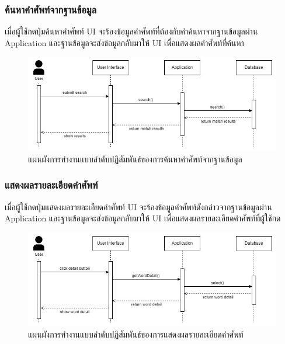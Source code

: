 \documentclass[12pt,oneside,openright,a4paper]{cpe-thai-project}
\begin{document}
\pagebreak
\subsubsection{ค้นหาคำศัพท์จากฐานข้อมูล}
\hspace{1cm}
เมื่อผู้ใช้กดปุ่มค้นหาคำศัพท์ UI จะร้องข้อมูลคำศัพท์ที่ต้องกับคำค้นหาจากฐานข้อมูลผ่าน Application
และฐานข้อมูลจะส่งข้อมูลกลับมาให้ UI เพื่อแสดงผลคำศัพท์ที่ค้นหา
\begin{figure}[!h]\centering
	\includegraphics[width=\textwidth, keepaspectratio=true]{image/chap3/sequence/Search.jpg}
	\caption{แผนผังการทำงานแบบลำดับปฏิสัมพันธ์ของการค้นหาคำศัพท์จากฐานข้อมูล}\label{fig:S_SearchWord}
\end{figure}

\subsubsection{แสดงผลรายละเอียดคำศัพท์}
\hspace{1cm}
เมื่อผู้ใช้กดปุ่มแสดงผลรายละเอียดคำศัพท์ UI จะร้องข้อมูลคำศัพท์ดังกล่าวจากฐานข้อมูลผ่าน Application
และฐานข้อมูลจะส่งข้อมูลกลับมาให้ UI เพื่อแสดงผลรายละเอียดคำศัพท์ที่ผู้ใช้กด
\begin{figure}[!h]\centering
	\includegraphics[width=\textwidth, keepaspectratio=true]{image/chap3/sequence/View-Search.jpg}
	\caption{แผนผังการทำงานแบบลำดับปฏิสัมพันธ์ของการแสดงผลรายละเอียดคำศัพท์}\label{fig:S_WordDetail}
\end{figure}

\pagebreak
\end{document}
